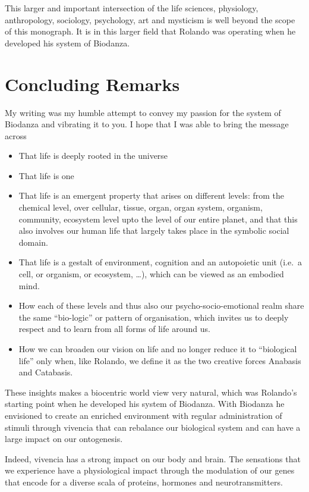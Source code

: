 \documentclass[
  11pt,
]{book}
\begin{document}
This larger and important intersection of the life sciences, physiology, anthropology, sociology, psychology, art and mysticism is well beyond the scope of this monograph. It is in this larger field that Rolando was operating when he developed his system of Biodanza.

\hypertarget{concluding-remarks}{%
\chapter{Concluding Remarks}\label{concluding-remarks}}

My writing was my humble attempt to convey my passion for the system of Biodanza and vibrating it to you. I hope that I was able to bring the message across

\begin{itemize}
\item
  That life is deeply rooted in the universe
\item
  That life is one
\item
  That life is an emergent property that arises on different levels: from the chemical level, over cellular, tissue, organ, organ system, organism, community, ecosystem level upto the level of our entire planet, and that this also involves our human life that largely takes place in the symbolic social domain.
\item
  That life is a gestalt of environment, cognition and an autopoietic unit (i.e.~a cell, or organism, or ecosystem, \ldots), which can be viewed as an embodied mind.
\item
  How each of these levels and thus also our psycho-socio-emotional realm share the same ``bio-logic'' or pattern of organisation, which invites us to deeply respect and to learn from all forms of life around us.
\item
  How we can broaden our vision on life and no longer reduce it to ``biological life'' only when, like Rolando, we define it as the two creative forces Anabasis and Catabasis.
\end{itemize}

These insights makes a biocentric world view very natural, which was Rolando's starting point when he developed his system of Biodanza. With Biodanza he envisioned to create an enriched environment with regular administration of stimuli through vivencia that can rebalance our biological system and can have a large impact on our ontogenesis.

Indeed, vivencia has a strong impact on our body and brain. The sensations that we experience have a physiological impact through the modulation of our genes that encode for a diverse scala of proteins, hormones and neurotransmitters.
\end{document}
